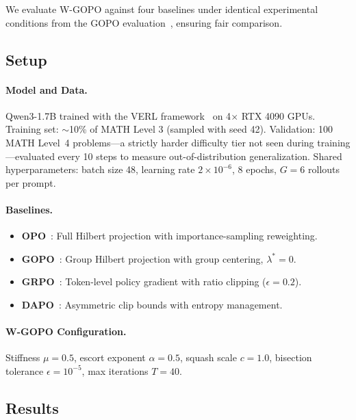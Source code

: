 \documentclass[11pt]{article}
\theoremstyle{definition}
\theoremstyle{remark}
\begin{document}
We evaluate W-GOPO against four baselines under identical experimental conditions from the GOPO evaluation~\cite{Wang2025GOPO}, ensuring fair comparison.

\subsection{Setup}

\paragraph{Model and Data.} Qwen3-1.7B trained with the VERL framework~\cite{Sheng2024HybridFlow} on 4$\times$ RTX 4090 GPUs. Training set: $\sim$10\% of MATH Level 3 (sampled with seed 42). Validation: 100 MATH Level~4 problems---a strictly harder difficulty tier not seen during training---evaluated every 10 steps to measure out-of-distribution generalization. Shared hyperparameters: batch size 48, learning rate $2 \times 10^{-6}$, 8 epochs, $G=6$ rollouts per prompt.

\paragraph{Baselines.}
\begin{itemize}[leftmargin=2em]
    \item \textbf{OPO}~\cite{Wang2025OPO}: Full Hilbert projection with importance-sampling reweighting.
    \item \textbf{GOPO}~\cite{Wang2025GOPO}: Group Hilbert projection with group centering, $\lambda^* = 0$.
    \item \textbf{GRPO}~\cite{Shao2024GRPO}: Token-level policy gradient with ratio clipping ($\epsilon = 0.2$).
    \item \textbf{DAPO}~\cite{Yu2025DAPO}: Asymmetric clip bounds with entropy management.
\end{itemize}

\paragraph{W-GOPO Configuration.} Stiffness $\mu = 0.5$, escort exponent $\alpha = 0.5$, squash scale $c = 1.0$, bisection tolerance $\epsilon = 10^{-5}$, max iterations $T = 40$.

\subsection{Results}
\end{document}
